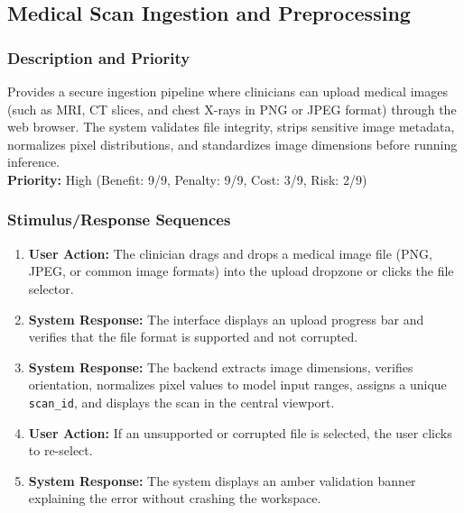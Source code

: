 \documentclass[12pt,a4paper]{report}
\begin{document}
\subsection{Medical Scan Ingestion and Preprocessing}
\subsubsection{Description and Priority}
Provides a secure ingestion pipeline where clinicians can upload medical images (such as MRI, CT slices, and chest X-rays in PNG or JPEG format) through the web browser. The system validates file integrity, strips sensitive image metadata, normalizes pixel distributions, and standardizes image dimensions before running inference.\\
\textbf{Priority:} High (Benefit: 9/9, Penalty: 9/9, Cost: 3/9, Risk: 2/9)

\subsubsection{Stimulus/Response Sequences}
\begin{enumerate}
    \item \textbf{User Action:} The clinician drags and drops a medical image file (PNG, JPEG, or common image formats) into the upload dropzone or clicks the file selector.
    \item \textbf{System Response:} The interface displays an upload progress bar and verifies that the file format is supported and not corrupted.
    \item \textbf{System Response:} The backend extracts image dimensions, verifies orientation, normalizes pixel values to model input ranges, assigns a unique \texttt{scan\_id}, and displays the scan in the central viewport.
    \item \textbf{User Action:} If an unsupported or corrupted file is selected, the user clicks to re-select.
    \item \textbf{System Response:} The system displays an amber validation banner explaining the error without crashing the workspace.
\end{enumerate}
\end{document}
